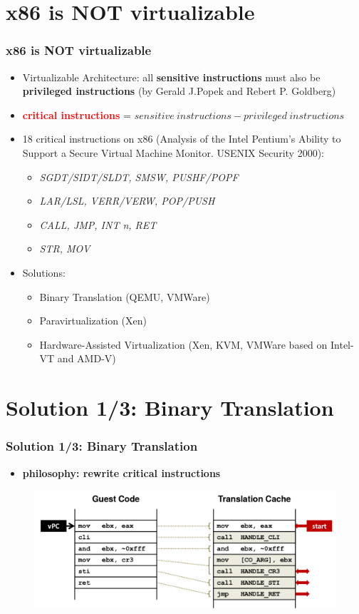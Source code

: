 \documentclass[aspectratio=169]{beamer}
\begin{document}

\section{x86 is NOT virtualizable}
\begin{frame}
\frametitle{x86 is NOT virtualizable}
\begin{itemize}
\item Virtualizable Architecture: all \textbf{sensitive instructions} must also be \textbf{privileged instructions} (by Gerald J.Popek and Rebert P. Goldberg)
\item \textbf{\textcolor{red}{critical instructions}} = $sensitive \ instructions - privileged \ instructions$ \pause
\item 18 critical instructions on x86 (Analysis of the Intel Pentium's Ability to Support a Secure Virtual Machine Monitor. USENIX Security 2000):
	\begin{itemize}
		\item \textit{SGDT/SIDT/SLDT, SMSW, PUSHF/POPF}
		\item \textit{LAR/LSL, VERR/VERW, POP/PUSH}
		\item \textit{CALL, JMP, INT n, RET}
		\item \textit{STR, MOV}
	\end{itemize}
\pause
\item Solutions:
	\begin{itemize}
		\item Binary Translation (QEMU, VMWare)
		\item Paravirtualization (Xen)
		\item Hardware-Assisted Virtualization (Xen, KVM, VMWare based on Intel-VT and AMD-V)
	\end{itemize}
\end{itemize}
\end{frame}


\section{Solution 1/3: Binary Translation}
\begin{frame}
\frametitle{Solution 1/3: Binary Translation}
\begin{itemize}
\item \textbf{philosophy: rewrite critical instructions}
\end{itemize}
\begin{figure}
\includegraphics[width=1.0\linewidth]{figures/qemu.pdf}
\end{figure}
\end{frame}
\end{document}
